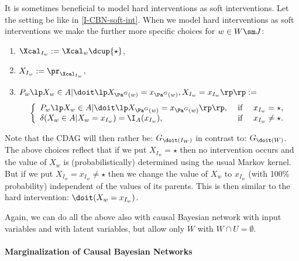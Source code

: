 \begin{Rem}
    It is sometimes beneficial to model hard interventions as soft interventions.
    Let the setting be like in \ref{I-CBN-soft-int}.
    When we model hard interventions as soft interventions we make the further more specific choices for $ w\in W \sm J$:
    \begin{enumerate}
        \item $\Xcal_{I_w} := \Xcal_w \dcup \{\star\}$,
        \item $X_{I_w} := \pr_{\Xcal_{I_w}}$,
        \item $ P_w\lp X_w \in A|\doit\lp X_{\Pa^G(w)}=x_{\Pa^G(w)} ,X_{I_w}=x_{I_w}\rp\rp : =$
            \[ \left\{ \begin{array}{lll}
                        P_w\lp X_w \in A|\doit\lp X_{\Pa^G(w)}=x_{\Pa^G(w)}\rp\rp, & \text{ if } & x_{I_w} = \star, \\
                        \delta(X_w \in A|X_w =x_{I_w}) = \I_A(x_{I_w}),  & \text{ if } & x_{I_w} \neq \star. 
                \end{array}\right.\]
    \end{enumerate}
    Note that the CDAG will then rather be: $G_{\doit(I_W)}$ in contrast to: $G_{\doit(W)}$. \\
    The above choices reflect that if we put $X_{I_w} = \star$ then no intervention occurs and the value of $X_w$ is
    (probabilistically) determined using the usual Markov kernel. 
    But if we put 
    $X_{I_w} = x_{I_w}  \neq\star$ then we change the value of $X_w$ to $x_{I_w}$ (with 100\% probability) 
    independent of the values of its parents. 
    This is then similar to the hard intervention: $\doit(X_w = x_{I_w})$.
\end{Rem}

\begin{Rem}
    Again, we can do all the above also with causal Bayesian network with input variables and with latent variables, 
    but allow only $W$ with $W \cap U = \emptyset$.
\end{Rem}

\paragraph{Marginalization of Causal Bayesian Networks}

